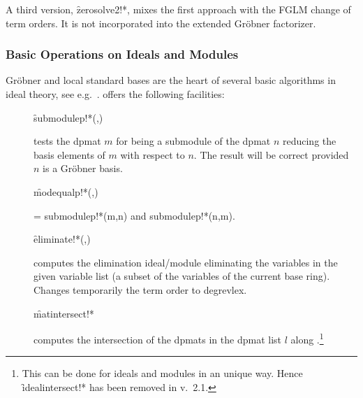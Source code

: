 A third version, \f{zerosolve2!*},
mixes the first approach with the
FGLM change of term orders. It is not incorporated into the extended
Gr\"obner factorizer.

\subsubsection{Basic Operations on Ideals and Modules}

Gr\"obner and local standard bases are the heart of several basic
algorithms in ideal theory, see e.g.\ \cite[6.2.]{Becker:93}.  offers
the following facilities:
\begin{description}
\item[]
  \begin{syntax}
    \f{submodulep!*}(,)
  \end{syntax}
  \hypertarget{procedure:SUBMODULEP!*}{}
tests the dpmat $m$ for being a submodule of the dpmat $n$
reducing the basis elements of $m$ with respect to $n$. The result
will be correct provided $n$ is a Gr\"obner basis.

\item[]
  \begin{syntax}
    \f{modequalp!*}(,)
  \end{syntax}
  \hypertarget{procedure:MODEQUALP!*}{}
 = submodulep!*(m,n) and submodulep!*(n,m).

\item[]
  \begin{syntax}
    \f{eliminate!*}(,)
  \end{syntax}
  \hypertarget{procedure:ELIMINATE!*}{}
computes the elimination ideal/module eliminating the variables
in the given variable list (a subset of the variables of the current
base ring). Changes temporarily the term order to degrevlex.

\item[]
  \begin{syntax}
    \f{matintersect!*} 
  \end{syntax}
  \hypertarget{procedure:MATINTERSECT!*}{}
computes the intersection of the dpmats in the dpmat list $l$
  along \cite[6.20]{Becker:93}.\footnote{This can be done for ideals and
modules in an unique way. Hence \f{idealintersect!*} has been
removed in v.~2.1.}

\end{description}


